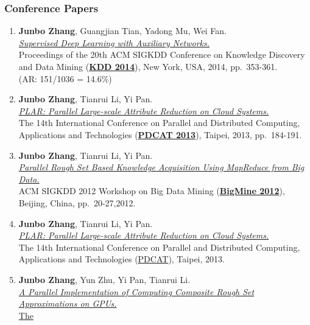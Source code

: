 \documentclass[10pt,a4paper]{article}
\begin{document}
\subsubsection{Conference Papers}\label{conference-papers}

\begin{enumerate}
\def\labelenumi{\arabic{enumi}.}
\item
  \textbf{Junbo Zhang}, Guangjian Tian, Yadong Mu, Wei Fan.\\
  \href{http://dx.doi.org/10.1145/2623330.2623618}{\emph{Supervised Deep
  Learning with Auxiliary Networks.}}\\ Proceedings of the 20th ACM
  SIGKDD Conference on Knowledge Discovery and Data Mining
  (\href{http://www.kdd.org/kdd2014/}{\textbf{KDD 2014}}), New York,
  USA, 2014, pp.~353-361.\\ (AR: 151/1036 = 14.6\%)
\item
  \textbf{Junbo Zhang}, Tianrui Li, Yi Pan.\\
  \href{http://dx.doi.org/10.1109/PDCAT.2013.36}{\emph{PLAR: Parallel
  Large-scale Attribute Reduction on Cloud Systems.}}\\ The 14th
  International Conference on Parallel and Distributed Computing,
  Applications and Technologies
  (\href{http://pdcat13.csie.ntust.edu.tw/}{\textbf{PDCAT 2013}}),
  Taipei, 2013, pp.~184-191.
\item
  \textbf{Junbo Zhang}, Tianrui Li, Yi Pan.\\
  \href{http://doi.acm.org/10.1145/2351316.2351320}{\emph{Parallel Rough
  Set Based Knowledge Acquisition Using MapReduce from Big Data.}}\\ ACM
  SIGKDD 2012 Workshop on Big Data Mining
  (\href{http://kdd2012.sigkdd.org/workshops.shtml}{\textbf{BigMine
  2012}}), Beijing, China, pp.~20-27,2012.
\item
  \textbf{Junbo Zhang}, Tianrui Li, Yi Pan.\\ \href{}{\emph{PLAR:
  Parallel Large-scale Attribute Reduction on Cloud Systems.}}\\ The
  14th International Conference on Parallel and Distributed Computing,
  Applications and Technologies
  (\href{http://pdcat13.csie.ntust.edu.tw/}{PDCAT}), Taipei, 2013.
\item
  \textbf{Junbo Zhang}, Yun Zhu, Yi Pan, Tianrui Li.\\ \href{}{\emph{A
  Parallel Implementation of Computing Composite Rough Set
  Approximations on GPUs.}}\\ \href{http://cs.smu.ca/jrs2013/}{The
}
\end{enumerate}
\end{document}
